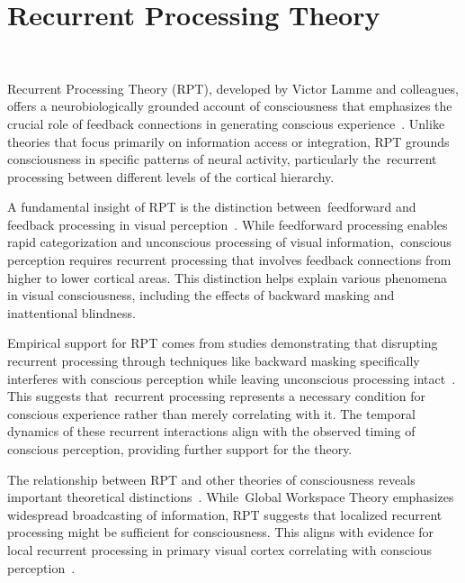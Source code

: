 \section{Recurrent Processing Theory}~

Recurrent Processing Theory (RPT), developed by Victor Lamme and colleagues, offers a neurobiologically grounded account of consciousness that emphasizes the crucial role of feedback connections in generating conscious experience~\cite{Lamme2006, Lamme2020}. Unlike theories that focus primarily on information access or integration, RPT grounds consciousness in specific patterns of neural activity, particularly the~recurrent processing between different levels of the cortical hierarchy.

A fundamental insight of RPT is the distinction between~feedforward and feedback processing in visual perception~\cite{Lamme2000, Rao1999}. While feedforward processing enables rapid categorization and unconscious processing of visual information,~conscious perception requires recurrent processing that involves feedback connections from higher to lower cortical areas. This distinction helps explain various phenomena in visual consciousness, including the effects of backward masking and inattentional blindness.

Empirical support for RPT comes from studies demonstrating that disrupting recurrent processing through techniques like backward masking specifically interferes with conscious perception while leaving unconscious processing intact~\cite{Fahrenfort2007, Koivisto2010}. This suggests that~recurrent processing represents a necessary condition for conscious experience rather than merely correlating with it. The temporal dynamics of these recurrent interactions align with the observed timing of conscious perception, providing further support for the theory.

The relationship between RPT and other theories of consciousness reveals important theoretical distinctions~\cite{Montemayor2019, Mehta2013}. While~Global Workspace Theory emphasizes widespread broadcasting of information, RPT suggests that localized recurrent processing might be sufficient for consciousness. This aligns with evidence for local recurrent processing in primary visual cortex correlating with conscious perception~\cite{Super2001, Lamme2020}.


